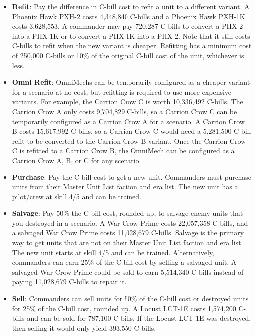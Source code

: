 \begin{itemize}
\item {\bfseries Refit}: Pay the difference in C-bill cost to refit a unit to a different variant.
A Phoenix Hawk PXH-2 costs 4,348,840 C-bills and a Phoenix Hawk PXH-1K costs 3,628,553.
A commander may pay 720,287 C-bills to convert a PHX-2 into a PHX-1K or to convert a PHX-1K into a PHX-2.
Note that it still costs C-bills to refit when the new variant is cheaper.
Refitting has a minimum cost of 250,000 C-bills or 10\% of the original C-bill cost of the unit, whichever is less.

\item {\bfseries Omni Refit}: OmniMechs can be temporarily configured as a cheaper variant for a scenario at no cost, but refitting is required to use more expensive variants.
For example, the Carrion Crow C is worth 10,336,492 C-bills.
The Carrion Crow A only costs 9,704,829 C-bills, so a Carrion Crow C can be temporarily configured as a Carrion Crow A for a scenario.
A Carrion Crow B costs 15,617,992 C-bills, so a Carrion Crow C would need a 5,281,500 C-bill refit to be converted to the Carrion Crow B variant.
Once the Carrion Crow C is refitted to a Carrion Crow B, the OmniMech can be configured as a Carrion Crow A, B, or C for any scenario.

\item {\bfseries Purchase}: Pay the C-bill cost to get a new unit.
Commanders must purchase units from their \href{http://www.masterunitlist.info}{Master Unit List} faction and era list.
The new unit has a pilot/crew at skill 4/5 and can be trained.

\item {\bfseries Salvage}: Pay 50\% the C-bill cost, rounded up, to salvage enemy units that you destroyed in a scenario.
A War Crow Prime costs 22,057,358 C-bills, and a salvaged War Crow Prime costs 11,028,679 C-bills.
Salvage is the primary way to get units that are not on their \href{http://www.masterunitlist.info}{Master Unit List} faction and era list.
The new unit starts at skill 4/5 and can be trained.
Alternatively, commanders can earn 25\% of the C-bill cost by selling a salvaged unit.
A salvaged War Crow Prime could be sold to earn 5,514,340 C-bills instead of paying 11,028,679 C-bills to repair it.

\item {\bfseries Sell}: Commanders can sell units for 50\% of the C-bill cost or destroyed units for 25\% of the C-bill cost, rounded up.
A Locust LCT-1E costs 1,574,200 C-bills and can be sold for 787,100 C-bills.
If the Locust LCT-1E was destroyed, then selling it would only yield 393,550 C-bills.

\end{itemize}
